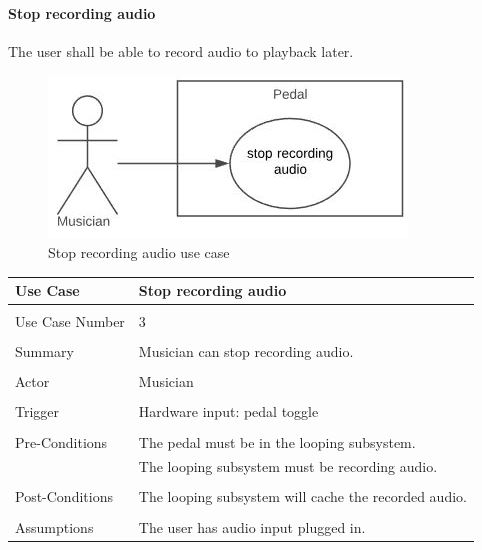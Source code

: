         \clearpage
        \paragraph{Stop recording audio} 
            The user shall be able to record audio to playback later.
            \begin{figure}[!ht]
                \centering
                \includegraphics[width=.5\textwidth]{diagrams/use_cases/uc-record-stop.JPG}
                \caption{Stop recording audio use case}
                \label{fig:uc-record-stop }
            \end{figure}
            
            \begin{table}[!ht]
                \centering
                \begin{tabular}{ l  l }
                    Use Case & Stop recording audio  \\
                    \hline \\
                    Use Case Number & 3 \\ \\
                    Summary & Musician can stop recording audio. \\ \\
                    Actor & Musician \\ \\
                    Trigger & Hardware input: pedal toggle \\ \\
                    Pre-Conditions & The pedal must be in the looping subsystem. \\
                    & The looping subsystem must be recording audio. \\ \\
                    Post-Conditions & The looping subsystem will cache the recorded audio. \\ \\
                    Assumptions & The user has audio input plugged in.\\ 
                \end{tabular}
            \end{table}
 
